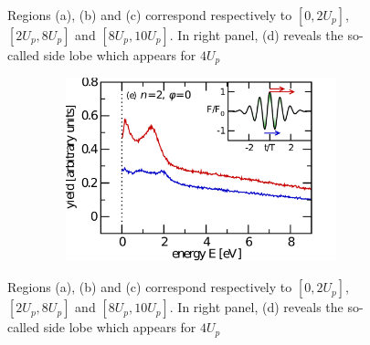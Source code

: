 \documentclass[a4paper]{article}
\begin{document}
\begin{figure}
\begin{subfigure} [t]{0.5\textwidth}
 \resizebox{1\textwidth}{!}{}
 \label{myATI} 
\end{subfigure}
\begin{subfigure} [t]{0.5\textwidth}
\hspace{-1.5cm}
 \resizebox{1.6\textwidth}{!}{}
 \label{myPAD} 
\end{subfigure}
 \caption{Regions (a), (b) and (c) correspond respectively to $[0, 2U_{p}]$, $[2U_{p}, 8U_{p}]$ and $[8U_{p}, 10U_{p}]$. In right panel, (d) reveals the so-called side lobe which appears for $4U_{p}$}
\end{figure}

\begin{figure}
\begin{subfigure} [t]{0.5\textwidth}
\hspace{-1cm}
 \includegraphics[width=1.2\textwidth, height=201px]{data/kastner.pdf}
 \label{myPAD} 
\end{subfigure}
\begin{subfigure} [t]{0.5\textwidth}
\hspace{-0.5cm}
  \raisebox{17px}{\resizebox{0.983\textwidth}{!}{}}
 \label{myATI} 
\end{subfigure}
 \caption{Regions (a), (b) and (c) correspond respectively to $[0, 2U_{p}]$, $[2U_{p}, 8U_{p}]$ and $[8U_{p}, 10U_{p}]$. In right panel, (d) reveals the so-called side lobe which appears for $4U_{p}$}
\end{figure}






\end{document}
